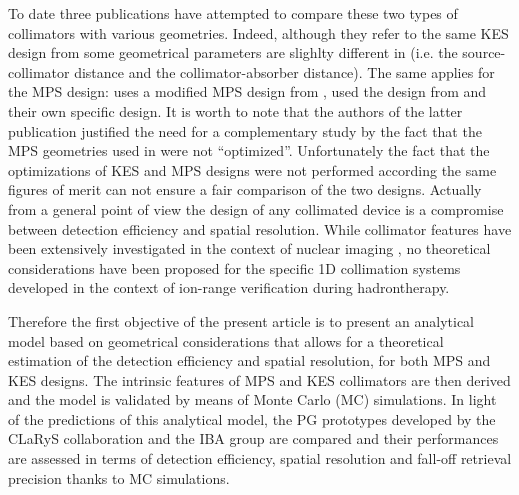 \documentclass[a4paper,english,12pt]{article}
\begin{document}
To date three publications \citep{Smeets2016, Lin2017, Park2017} have attempted to compare these two types of collimators with various geometries. Indeed, although they refer to the same KES design from \citep{Perali2014} some geometrical parameters are slighlty different in \citep{Lin2017, Park2017} (i.e. the source-collimator distance and the collimator-absorber distance). The same applies for the MPS design: \cite{Smeets2016} uses a modified MPS design from \cite{Pinto2014a}, \cite{Lin2017} used the design from \cite{Gueth2013} and \cite{Park2017} their own specific design. It is worth to note that the authors of the latter publication justified the need for a complementary study by the fact that the MPS geometries used in \cite{Smeets2016, Lin2017} were not \enquote{optimized}. 
Unfortunately the fact that the optimizations of KES and MPS designs were not performed according the same figures of merit can not ensure a fair comparison of the two designs. Actually from a general point of view the design of any collimated device is a compromise between detection efficiency and spatial resolution. While collimator features have been extensively investigated in the context of nuclear imaging \citep{Gunter2004}, no theoretical considerations have been proposed for the specific 1D collimation systems developed in the context of ion-range verification during hadrontherapy.

Therefore the first objective of the present article is to present an analytical model based on geometrical considerations that allows for a theoretical estimation of the detection efficiency and spatial resolution, for both MPS and KES designs. The intrinsic features of MPS and KES collimators are then derived and the model is validated by means of Monte Carlo (MC) simulations. In light of the predictions of this analytical model, the PG prototypes developed by the CLaRyS collaboration and the IBA group are compared and their performances are assessed in terms of detection efficiency, spatial resolution and fall-off retrieval precision thanks to MC simulations.

\end{document}
